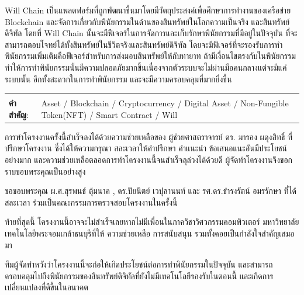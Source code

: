 \documentclass[12pt,oneside,openright,a4paper]{cpe-thai-project}
\begin{document}
\tab Will Chain เป็นแพลตฟอร์มที่ถูกพัฒนาขึ้นมาโดยมีวัตถุประสงค์เพื่อศึกษาการทำงานของเครือข่าย Blockchain  และจัดการเกี่ยวกับพินัยกรรมในด้านของสินทรัพย์ในโลกความเป็นจริง และสินทรัพย์ดิจิทัล โดยที่ Will Chain นั้นจะมีฟีเจอร์ในการจัดการและเก็บรักษาพินัยกรรมที่มีอยู่ในปัจจุบัน ที่จะสามารถตอบโจทย์ได้ทั้งสินทรัพย์ในชีวิตจริงและสินทรัพย์ดิจิทัล โดยจะมีฟีเจอร์ที่จะรองรับการทำพินัยกรรมเพิ่มเติมคือฟีเจอร์สำหรับการส่งมอบสินทรัพย์ให้กับทายาท ถ้ามีเงื่อนไขตรงกับในพินัยกรรม ทำให้การทำพินัยกรรมนั้นมีความปลอดภัยมากขึ้นเนื่องจากตัวระบบจะไม่ผ่านมือคนกลางแต่จะมีแค่ระบบนั้น อีกทั้งสะดวกในการทำพินัยกรรม และจะมีความครอบคลุมที่มากยิ่งขึ้น
\begin{flushleft}
\begin{tabular*}{\textwidth}{@{}lp{}}
 & \\

\textbf{คำสำคัญ}: & Asset / Blockchain / Cryptocurrency / Digital Asset / Non-Fungible Token(NFT) /  Smart Contract / Will 
\end{tabular*}
\end{flushleft}
\endabstract


\preface
\tab การทําโครงงานครั้งนี้สําเร็จลงได้ด้วยความช่วยเหลือของ ผู้ช่วยศาสตราจารย์ ดร. มารอง ผดุงสิทธิ์ ที่ปรึกษาโครงงาน ซึ่งได้ให้ความกรุณา สละเวลาให้คําปรึกษา คําแนะนํา ข้อเสนอแนะอันมีประโยชน์อย่างมาก และความช่วยเหลือตลอดการทําโครงงานนี้จนสําเร็จลุล่วงได้ด้วยดี ผู้จัดทําโครงงานจึงขอกราบขอบพระคุณเป็นอย่างสูง

\tab ขอขอบพระคุณ ผ.ศ.สุรพนธ์ ตุ้มนาค , ดร.ปิยนิตย์ เวปุลานนท์ และ รศ.ดร.ธํารงรัตน์ อมรรักษา ที่ได้สละเวลา
ร่วมเป็นคณะกรรมการตรวจสอบโครงงานในครั้งนี้ 

\tab ท้ายที่สุดนี้ โครงงานนี้อาจจะไม่สําเร็จเลยหากไม่มีเพื่อนในภาควิชาวิศวกรรมคอมพิวเตอร์ มหาวิทยาลัยเทคโนโลยีพระจอมเกล้าธนบุรีที่ให้ 
ความช่วยเหลือ การสนับสนุน รวมทั้งคอยเป็นกําลังใจสําคัญเสมอมา 

\tab ทีมผู้จัดทำหวังว่าโครงงานนี้จะก่อให้เกิดประโยชน์ต่อการทำพินัยกรรมในปัจจุบัน และสามารถครอบคลุมไปถึงพินัยกรรมของสินทรัพย์ดิจิทัลที่ยังไม่มีเทคโนโลยีรองรับในตอนนี้ และเกิดการเปลี่ยนแปลงที่ดีขึ้นในอนาคต

\tableofcontents                    
\listoftables
\listoffigures                      
\end{document}
